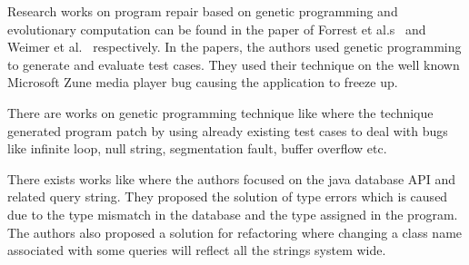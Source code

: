 {
Research works on program repair based on genetic programming and evolutionary
computation can be found in the paper of Forrest et al.s~\cite{conf/gecco/2009g}
and Weimer et al.~\cite{DBLP:journals/cacm/WeimerFGN10} respectively. In the
papers, the authors used genetic programming to generate and evaluate test
cases. They used their technique on the well known Microsoft Zune media player
bug causing the application to freeze up.


There are works on genetic programming technique like
\cite{LeGoues:2012Ex, LeGoues:2012, DBLP:journals/cacm/WeimerFGN10} where the
 technique generated program patch by using already existing test cases to deal
with bugs like infinite loop, null string, segmentation fault, buffer overflow
etc.


There exists works like \cite{Tatlock:2008} where the authors focused on
the java database API and related query string. They proposed the solution of
type errors which is caused due to the type mismatch in the database and the
type assigned in the program. The authors also proposed a solution for
refactoring where changing a class name associated with some queries will
reflect all the strings system wide.

}



